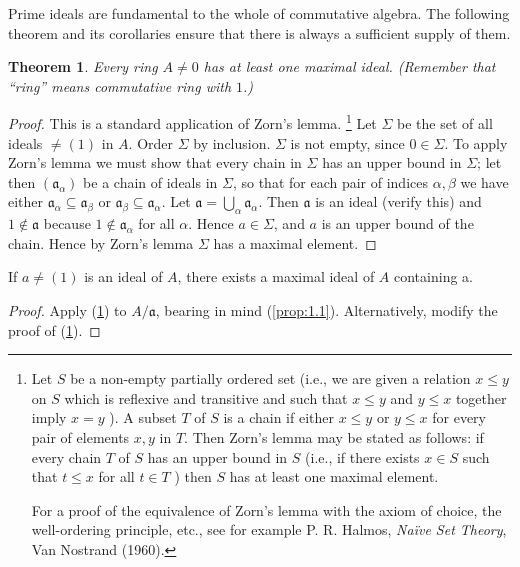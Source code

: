 \documentclass[class=book, crop=false]{standalone}
\newtheorem{theorem}{Theorem}[chapter]
\theoremstyle{definition}
\theoremstyle{remark}
\begin{document}
Prime ideals are fundamental to the whole of commutative algebra. The following
theorem and its corollaries ensure that there is always a sufficient supply of
them.
\begin{theorem}\label{thm:1.3}
  Every ring $A \neq 0$ has at least one maximal ideal. \textnormal{(Remember
    that ``ring'' means commutative ring with $1$.)}
\end{theorem}
\begin{proof}
  This is a standard application of Zorn's lemma. \footnote{Let $S$ be a
    non-empty partially ordered set (i.e., we are given a relation $x \leq y$ on
    $S$ which is reflexive and transitive and such that $x \leq y$ and
    $y \leq x$ together imply $x=y$ ). A subset $T$ of $S$ is a chain if either
    $x \leq y$ or $y \leq x$ for every pair of elements $x, y$ in $T$. Then
    Zorn's lemma may be stated as follows: if every chain $T$ of $S$ has an
    upper bound in $S$ (i.e., if there exists $x \in S$ such that $t \leq x$ for
    all $t \in T$ ) then $S$ has at least one maximal element.

    For a proof of the equivalence of Zorn's lemma with the axiom of choice, the
    well-ordering principle, etc., see for example P. R. Halmos, \textit{Na\"ive
      Set Theory}, Van Nostrand (1960).} Let $\Sigma$ be the set of all ideals
  $\ne (1)$ in $A$. Order $\Sigma$ by inclusion. $\Sigma$ is not empty, since
  $0 \in \Sigma$. To apply Zorn's lemma we must show that every chain in
  $\Sigma$ has an upper bound in $\Sigma$; let then
  $\left(\mathfrak{a}_{\alpha}\right)$ be a chain of ideals in $\Sigma$, so that
  for each pair of indices $\alpha, \beta$ we have either
  $\mathfrak{a}_{\alpha} \subseteq \mathfrak{a}_{\beta}$ or
  $\mathfrak{a}_{\beta} \subseteq \mathfrak{a}_{\alpha}$. Let
  $\mathfrak{a}=\bigcup_{\alpha} \mathfrak{a}_{\alpha}$. Then $\mathfrak{a}$ is
  an ideal (verify this) and $1 \notin \mathfrak{a}$ because
  $1 \notin \mathfrak{a}_{\alpha}$ for all $\alpha$. Hence $a \in \Sigma$, and
  $a$ is an upper bound of the chain. Hence by Zorn's lemma $\Sigma$ has a
  maximal element.
\end{proof}
\begin{corollary}\label{cor:1.4}
  If $a \neq(1)$ is an ideal of $A$, there exists a maximal ideal of $A$
  containing a.
\end{corollary}
\begin{proof}
  Apply (\ref{thm:1.3}) to $A / \mathfrak{a}$, bearing in mind (\ref{prop:1.1}). Alternatively,
  modify the proof of (\ref{thm:1.3}).
\end{proof}
\end{document}
